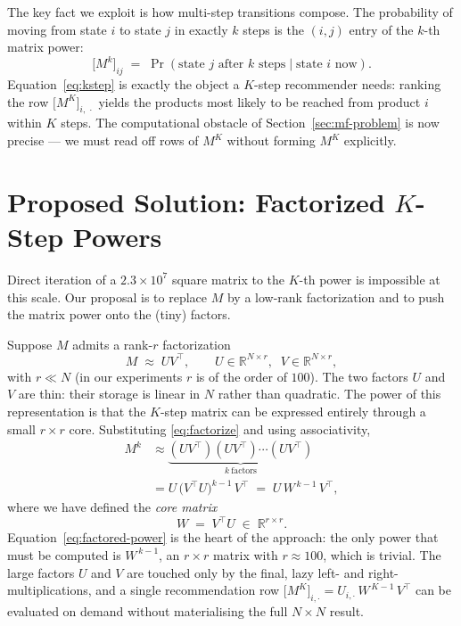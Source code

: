 The key fact we exploit is how multi-step transitions compose. The
probability of moving from state $i$ to state $j$ in exactly $k$ steps is the
$(i,j)$ entry of the $k$-th matrix power:
\begin{equation}
  \label{eq:kstep}
  \bigl[M^{k}\bigr]_{ij}
    \;=\; \Pr\!\left(\text{state } j \text{ after } k \text{ steps}
                     \mid \text{state } i \text{ now}\right).
\end{equation}
Equation~\eqref{eq:kstep} is exactly the object a $K$-step recommender needs:
ranking the row $\bigl[M^{K}\bigr]_{i,\,\cdot}$ yields the products most likely
to be reached from product $i$ within $K$ steps. The computational obstacle of
Section~\ref{sec:mf-problem} is now precise --- we must read off rows of
$M^{K}$ without forming $M^{K}$ explicitly.

\section{Proposed Solution: Factorized \texorpdfstring{$K$}{K}-Step Powers}
\label{sec:mf-solution}

Direct iteration of a $2.3\times10^{7}$ square matrix to the $K$-th power is
impossible at this scale. Our proposal is to replace $M$ by a low-rank
factorization and to push the matrix power onto the (tiny) factors.

Suppose $M$ admits a rank-$r$ factorization
\begin{equation}
  \label{eq:factorize}
  M \;\approx\; U V^{\top},
  \qquad U \in \mathbb{R}^{N \times r},\;\; V \in \mathbb{R}^{N \times r},
\end{equation}
with $r \ll N$ (in our experiments $r$ is of the order of $100$). The two
factors $U$ and $V$ are thin: their storage is linear in $N$ rather than
quadratic. The power of this representation is that the $K$-step matrix can be
expressed entirely through a small $r \times r$ core. Substituting
\eqref{eq:factorize} and using associativity,
\begin{align}
  M^{k}
    &\approx \underbrace{(U V^{\top})(U V^{\top}) \cdots (U V^{\top})}_{k\ \text{factors}}
     \nonumber\\[2pt]
    &= U \,\bigl(V^{\top} U\bigr)^{k-1}\, V^{\top}
     \;=\; U\, W^{\,k-1}\, V^{\top},
  \label{eq:factored-power}
\end{align}
where we have defined the \emph{core matrix}
\begin{equation}
  \label{eq:core}
  W \;=\; V^{\top} U \;\in\; \mathbb{R}^{r \times r}.
\end{equation}
Equation~\eqref{eq:factored-power} is the heart of the approach: the only
power that must be computed is $W^{\,k-1}$, an $r\times r$ matrix with
$r \approx 100$, which is trivial. The large factors $U$ and $V$ are touched
only by the final, lazy left- and right-multiplications, and a single
recommendation row $\bigl[M^{K}\bigr]_{i,\cdot}
= U_{i,\cdot}\,W^{\,K-1}\,V^{\top}$ can be evaluated on demand without
materialising the full $N \times N$ result.

